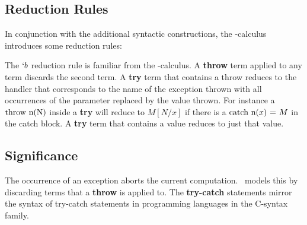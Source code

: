 \subsection{Reduction Rules}
In conjunction with the additional syntactic constructions,
the \ltry-calculus introduces some reduction rules:


The $`b$ reduction rule is familiar from the \lam-calculus. 
A \textbf{throw} term applied to any term discards the second term.
A \textbf{try} term that contains a throw reduces to the handler that corresponds to the name of the exception thrown with all occurrences of the parameter replaced by the value thrown. 
For instance a $\text{throw n(N)}$ inside a \textbf{try} will reduce to $M[N/x]$ if there is a $\text{catch n($x$) = $M$}$ in the catch block.
A \textbf{try} term that contains a value reduces to just that value.

\subsection{Significance}
The occurrence of an exception aborts the current computation.
\ltry\ models this by discarding terms that a \textbf{throw} is applied to.
The \textbf{try-catch} statements mirror the syntax of try-catch statements in programming languages in the C-syntax family.

